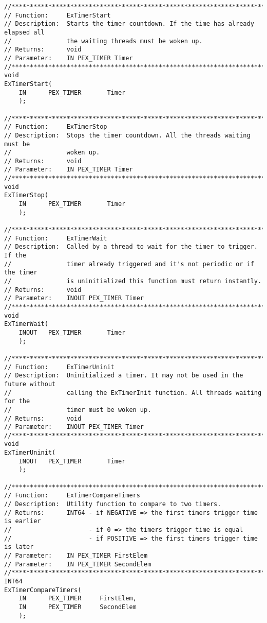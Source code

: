 \begin{appendices}
\begin{lstlisting}[caption={Timer functions},label={lst:TimerFunc}]
//******************************************************************************
// Function:     ExTimerStart
// Description:  Starts the timer countdown. If the time has already elapsed all
//               the waiting threads must be woken up.
// Returns:      void
// Parameter:    IN PEX_TIMER Timer
//******************************************************************************
void
ExTimerStart(
    IN      PEX_TIMER       Timer
    );

//******************************************************************************
// Function:     ExTimerStop
// Description:  Stops the timer countdown. All the threads waiting must be
//               woken up.
// Returns:      void
// Parameter:    IN PEX_TIMER Timer
//******************************************************************************
void
ExTimerStop(
    IN      PEX_TIMER       Timer
    );

//******************************************************************************
// Function:     ExTimerWait
// Description:  Called by a thread to wait for the timer to trigger. If the
//               timer already triggered and it's not periodic or if the timer
//               is uninitialized this function must return instantly.
// Returns:      void
// Parameter:    INOUT PEX_TIMER Timer
//******************************************************************************
void
ExTimerWait(
    INOUT   PEX_TIMER       Timer
    );

//******************************************************************************
// Function:     ExTimerUninit
// Description:  Uninitialized a timer. It may not be used in the future without
//               calling the ExTimerInit function. All threads waiting for the
//               timer must be woken up.
// Returns:      void
// Parameter:    INOUT PEX_TIMER Timer
//******************************************************************************
void
ExTimerUninit(
    INOUT   PEX_TIMER       Timer
    );

//******************************************************************************
// Function:     ExTimerCompareTimers
// Description:  Utility function to compare to two timers.
// Returns:      INT64 - if NEGATIVE => the first timers trigger time is earlier
//                     - if 0 => the timers trigger time is equal
//                     - if POSITIVE => the first timers trigger time is later
// Parameter:    IN PEX_TIMER FirstElem
// Parameter:    IN PEX_TIMER SecondElem
//******************************************************************************
INT64
ExTimerCompareTimers(
    IN      PEX_TIMER     FirstElem,
    IN      PEX_TIMER     SecondElem
    );
\end{lstlisting}


\end{appendices}
